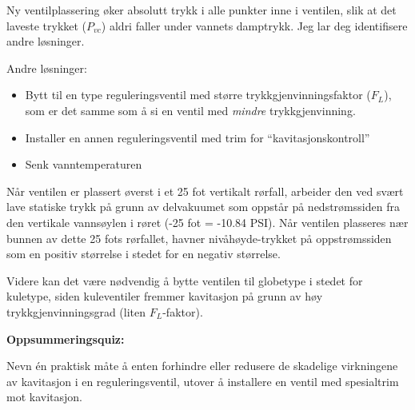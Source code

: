
Ny ventilplassering øker absolutt trykk i alle punkter inne i ventilen, slik at det laveste trykket ($P_{vc}$) aldri faller under vannets damptrykk. Jeg lar deg identifisere andre løsninger.
 






Andre løsninger:

\begin{itemize}
\item{} Bytt til en type reguleringsventil med større trykkgjenvinningsfaktor ($F_L$), som er det samme som å si en ventil med {\it mindre} trykkgjenvinning.
\vskip 5pt
\item{} Installer en annen reguleringsventil med trim for ``kavitasjonskontroll''
\vskip 5pt
\item{} Senk vanntemperaturen
\end{itemize}

\vskip 10pt

Når ventilen er plassert øverst i et 25 fot vertikalt rørfall, arbeider den ved svært lave statiske trykk på grunn av delvakuumet som oppstår på nedstrømssiden fra den vertikale vannsøylen i røret (-25 fot = -10.84 PSI). Når ventilen plasseres nær bunnen av dette 25 fots rørfallet, havner nivåhøyde-trykket på oppstrømssiden som en positiv størrelse i stedet for en negativ størrelse.

Videre kan det være nødvendig å bytte ventilen til globetype i stedet for kuletype, siden kuleventiler fremmer kavitasjon på grunn av høy trykkgjenvinningsgrad (liten $F_{L}$-faktor).

\vfil \eject

\noindent
{\bf Oppsummeringsquiz:}

Nevn én praktisk måte å enten forhindre eller redusere de skadelige virkningene av kavitasjon i en reguleringsventil, utover å installere en ventil med spesialtrim mot kavitasjon.




